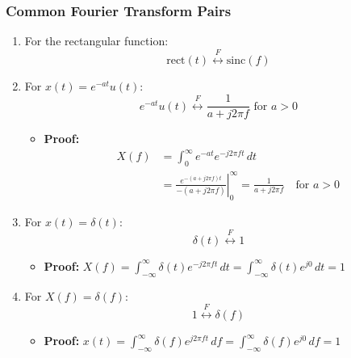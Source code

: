 \subsubsection{Common Fourier Transform Pairs}
\begin{definition}
    \begin{enumerate}
    \item For the rectangular function:
    \[
    \text{rect}(t) \overset{F}{\leftrightarrow} \text{sinc}(f)
    \]

    \item For \( x(t) = e^{-at} u(t) \):
    \begin{equation*}
        e^{-at} u(t) \overset{F}{\leftrightarrow} \frac{1}{a + j 2 \pi f} \text{ for $a > 0$}
    \end{equation*}
    \begin{itemize}
        \item \textbf{Proof:} \begin{align*}
            X(f) &= \int_{0}^{\infty} e^{-at} e^{-j 2 \pi f t} \, dt \\
                &= \left. \frac{e^{-(a + j 2 \pi f)t}}{-(a + j 2 \pi f)} \right|_0^{\infty} = \frac{1}{a + j 2 \pi f} \quad \text{for } a > 0
        \end{align*}
    \end{itemize}

    \item For \( x(t) = \delta(t) \):
    \begin{equation*}
        \delta(t) \overset{F}{\leftrightarrow} 1 
    \end{equation*}
    \begin{itemize}
        \item \textbf{Proof:} $X(f) = \int_{-\infty}^{\infty} \delta(t) e^{-j 2 \pi f t} \, dt =  \int_{-\infty}^{\infty} \delta(t) e^{j0} \, dt = 1$
    \end{itemize}

    \item For \( X(f) = \delta(f) \):
    \begin{equation*}
        1 \overset{F}{\leftrightarrow} \delta(f)
    \end{equation*}
    \begin{itemize}
        \item \textbf{Proof:} $x(t) = \int_{-\infty}^{\infty} \delta(f) e^{j 2 \pi f t} \, df = \int_{-\infty}^{\infty} \delta(f) e^{j 0} \, df = 1$
    \end{itemize}


\end{enumerate}
\end{definition}

